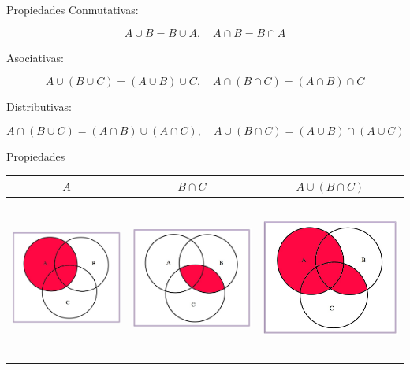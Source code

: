 \documentclass[
  ignorenonframetext,
]{beamer}
\begin{document}
\begin{frame}{Propiedades}
\protect\hypertarget{propiedades}{}
Conmutativas:

\[A\cup B=B\cup A, \quad A\cap B=B\cap A\]

Asociativas:

\[A\cup(B\cup C)=(A\cup B)\cup C, \quad A\cap(B\cap C)=(A\cap B)\cap C\]

Distributivas:

\[A\cap(B\cup C)=(A\cap B)\cup (A\cap C), \quad A\cup(B\cap C)=(A\cup B)\cap (A\cup C)\]
\end{frame}

\begin{frame}{Propiedades}
\protect\hypertarget{propiedades-1}{}
\begin{longtable}[]{@{}ccc@{}}
\toprule
\(A\) & \(B\cap C\) & \(A\cup (B\cap C)\) \\
\midrule
\endhead
\includegraphics[width=\textwidth,height=2.08333in]{Images/proba1dibujos/distr11.jpg}
&
\includegraphics[width=\textwidth,height=2.08333in]{Images/proba1dibujos/distr12.jpg}
&
\includegraphics[width=\textwidth,height=2.08333in]{Images/proba1dibujos/distr13.jpg} \\
\bottomrule
\end{longtable}
\end{frame}
\end{document}
